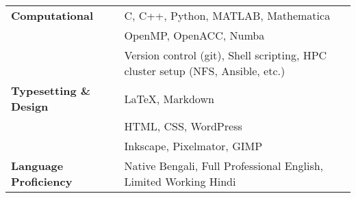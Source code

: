 \begin{longtable}[l]{@{} m{4.75cm} m{15cm}}
\textbf{Computational} & C, C++, Python, MATLAB, Mathematica\\
                                  & OpenMP, OpenACC, Numba\\
                                  & Version control (git), Shell scripting, HPC cluster setup (NFS, Ansible, etc.)\\[0.2cm]

\textbf{Typesetting \& Design} & \LaTeX, Markdown \\
                                                          & HTML, CSS, WordPress \\
                                                          & Inkscape, Pixelmator, GIMP\\[0.2cm]
                                                            
\textbf{Language Proficiency} & Native Bengali, Full Professional English,  Limited Working Hindi\\                                               
\end{longtable}